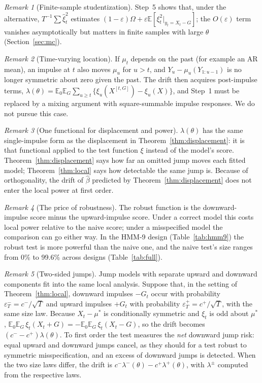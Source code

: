 \documentclass[11pt,a4paper]{article}
\theoremstyle{definition}
\theoremstyle{remark}
\newtheorem{remark}{Remark}
\newcommand{\E}{\mathbb{E}}
\begin{document}
\begin{remark}[Finite-sample studentization]
Step~5 shows that, under the alternative, $T^{-1}\sum\hat\xi_t^2$ estimates $(1-\varepsilon)\Omega+\varepsilon\E[\xi_t^2|_{y_t=X_t-G}]$; the $O(\varepsilon)$ term vanishes asymptotically but matters in finite samples with large $\theta$ (Section~\ref{sec:mc}).
\end{remark}

\begin{remark}[Time-varying location]
If $\mu_t$ depends on the past (for example an AR mean), an impulse at $t$ also moves $\mu_u$ for $u>t$, and $Y_u-\mu_u(Y_{1:u-1})$ is no longer symmetric about zero given the past. The drift then acquires post-impulse terms, $\lambda(\theta)=\E_0\E_G\sum_{u\ge t}\{\xi_u(X^{[t,G]})-\xi_u(X)\}$, and Step~1 must be replaced by a mixing argument with square-summable impulse responses. We do not pursue this case.
\end{remark}

\begin{remark}[One functional for displacement and power]\label{rem:onefunctional}
$\lambda(\theta)$ has the same single-impulse form as the displacement in Theorem~\ref{thm:displacement}: it is that functional applied to the test function $\xi$ instead of the model's score. Theorem~\ref{thm:displacement} says how far an omitted jump moves each fitted model; Theorem~\ref{thm:local} says how detectable the same jump is. Because of orthogonality, the drift of $\hat\beta$ predicted by Theorem~\ref{thm:displacement} does not enter the local power at first order.
\end{remark}

\begin{remark}[The price of robustness]
The robust function is the downward-impulse score minus the upward-impulse score. Under a correct model this costs local power relative to the naive score; under a misspecified model the comparison can go either way. In the HMM-9 design (Table~\ref{tab:hmm9}) the robust test is more powerful than the naive one, and the naive test's size ranges from 0\% to 99.6\% across designs (Table~\ref{tab:full}).
\end{remark}

\begin{remark}[Two-sided jumps]\label{rem:twosided}
Jump models with separate upward and downward components \citep{kou2002,ramezani2007} fit into the same local analysis. Suppose that, in the setting of Theorem~\ref{thm:local}, downward impulses $-G_t$ occur with probability $\varepsilon^-_T=c^-/\sqrt T$ and upward impulses $+G_t$ with probability $\varepsilon^+_T=c^+/\sqrt T$, with the same size law. Because $X_t-\mu^*$ is conditionally symmetric and $\xi_t$ is odd about $\mu^*$, $\E_0\E_G\,\xi_t(X_t+G)=-\E_0\E_G\,\xi_t(X_t-G)$, so the drift becomes $(c^--c^+)\lambda(\theta)$. To first order the test measures the \emph{net} downward jump risk: equal upward and downward jumps cancel, as they should for a test robust to symmetric misspecification, and an excess of downward jumps is detected. When the two size laws differ, the drift is $c^-\lambda^-(\theta)-c^+\lambda^+(\theta)$, with $\lambda^\pm$ computed from the respective laws.
\end{remark}
\end{document}
